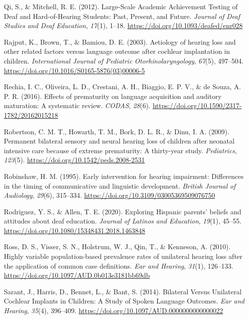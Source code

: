 \documentclass[
  english,
  man]{apa6}
\begin{document}
\leavevmode\hypertarget{ref-qi2012}{}%
Qi, S., \& Mitchell, R. E. (2012). Large-Scale Academic Achievement Testing of Deaf and Hard-of-Hearing Students: Past, Present, and Future. \emph{Journal of Deaf Studies and Deaf Education}, \emph{17}(1), 1--18. \url{https://doi.org/10.1093/deafed/enr028}

\leavevmode\hypertarget{ref-rajput2003}{}%
Rajput, K., Brown, T., \& Bamiou, D. E. (2003). Aetiology of hearing loss and other related factors versus language outcome after cochlear implantation in children. \emph{International Journal of Pediatric Otorhinolaryngology}, \emph{67}(5), 497--504. \url{https://doi.org/10.1016/S0165-5876(03)00006-5}

\leavevmode\hypertarget{ref-rechia2016}{}%
Rechia, I. C., Oliveira, L. D., Crestani, A. H., Biaggio, E. P. V., \& de Souza, A. P. R. (2016). Effects of prematurity on language acquisition and auditory maturation: A systematic review. \emph{CODAS}, \emph{28}(6). \url{https://doi.org/10.1590/2317-1782/20162015218}

\leavevmode\hypertarget{ref-robertson2009}{}%
Robertson, C. M. T., Howarth, T. M., Bork, D. L. R., \& Dinu, I. A. (2009). Permanent bilateral sensory and neural hearing loss of children after neonatal intensive care because of extreme prematurity: A thirty-year study. \emph{Pediatrics}, \emph{123}(5). \url{https://doi.org/10.1542/peds.2008-2531}

\leavevmode\hypertarget{ref-robinshaw1995}{}%
Robinshaw, H. M. (1995). Early intervention for hearing impairment: Differences in the timing of communicative and linguistic development. \emph{British Journal of Audiology}, \emph{29}(6), 315--334. \url{https://doi.org/10.3109/03005369509076750}

\leavevmode\hypertarget{ref-rodriguez2020}{}%
Rodriguez, Y. S., \& Allen, T. E. (2020). Exploring Hispanic parents' beliefs and attitudes about deaf education. \emph{Journal of Latinos and Education}, \emph{19}(1), 45--55. \url{https://doi.org/10.1080/15348431.2018.1463848}

\leavevmode\hypertarget{ref-ross2010}{}%
Ross, D. S., Visser, S. N., Holstrum, W. J., Qin, T., \& Kenneson, A. (2010). Highly variable population-based prevalence rates of unilateral hearing loss after the application of common case definitions. \emph{Ear and Hearing}, \emph{31}(1), 126--133. \url{https://doi.org/10.1097/AUD.0b013e3181bb69db}

\leavevmode\hypertarget{ref-sarant2014}{}%
Sarant, J., Harris, D., Bennet, L., \& Bant, S. (2014). Bilateral Versus Unilateral Cochlear Implants in Children: A Study of Spoken Language Outcomes. \emph{Ear and Hearing}, \emph{35}(4), 396--409. \url{https://doi.org/10.1097/AUD.0000000000000022}
\end{document}
